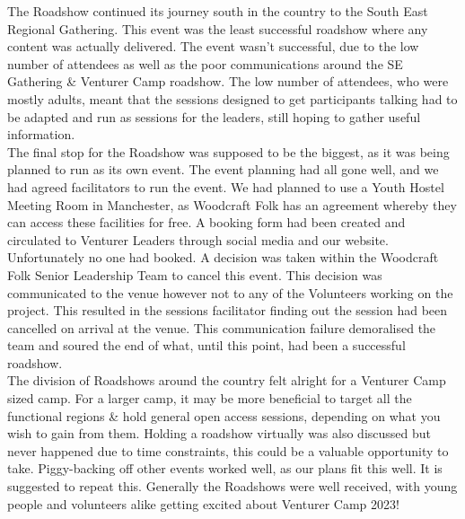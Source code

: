 The Roadshow continued its journey south in the country to the South East Regional Gathering. This event was the least successful roadshow where any content was actually delivered. The event wasn't successful, due to the low number of attendees as well as the poor communications around the SE Gathering \& Venturer Camp roadshow. The low number of attendees, who were mostly adults, meant that the sessions designed to get participants talking had to be adapted and run as sessions for the leaders, still hoping to gather useful information. \\

The final stop for the Roadshow was supposed to be the biggest, as it was being planned to run as its own event. The event planning had all gone well, and we had agreed facilitators to run the event. We had planned to use a Youth Hostel Meeting Room in Manchester, as Woodcraft Folk has an agreement whereby they can access these facilities for free. A booking form had been created and circulated to Venturer Leaders through social media and our website. Unfortunately no one had booked. A decision was taken within the Woodcraft Folk Senior Leadership Team to cancel this event. This decision was communicated to the venue however not to any of the Volunteers working on the project. This resulted in the sessions facilitator finding out the session had been cancelled on arrival at the venue. This communication failure demoralised the team and soured the end of what, until this point, had been a successful roadshow.\\

The division of Roadshows around the country felt alright for a Venturer Camp sized camp. For a larger camp, it may be more beneficial to target all the functional regions \& hold general open access sessions, depending on what you wish to gain from them. Holding a roadshow virtually was also discussed but never happened due to time constraints, this could be a valuable opportunity to take. Piggy-backing off other events worked well, as our plans fit this well. It is suggested to repeat this. Generally the Roadshows were well received, with young people and volunteers alike getting excited about Venturer Camp 2023!
